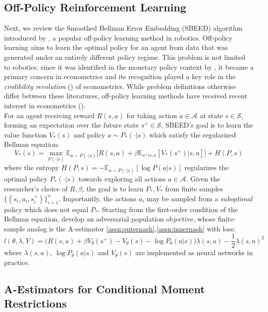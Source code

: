 \documentclass[12pt]{article}
\theoremstyle{myplain}
\theoremstyle{definition}
\theoremstyle{definition}
\theoremstyle{remark}
\numberwithin{equation}{section}
\begin{document}
\subsection{Off-Policy Reinforcement Learning} \label{ex:RL}

Next, we review the Smoothed Bellman Error Embedding (SBEED) algorithm introduced by \cite{sbeed}, a popular off-policy learning method in robotics. Off-policy learning aims to learn the optimal policy for an agent from data that was generated under an entirely different policy regime. This problem is not limited to robotics: since it was identified in the monetary policy context by \cite{LUCAS197619}, it became a primary concern in econometrics and its recognition played a key role in the {\it credibility revolution} (\cite{credibilityrevolution}) of econometrics. While problem definitions otherwise differ between these literatures, off-policy learning methods have received recent interest in econometrics (\cite{offpolicyathey, policylearning}).\\

For an agent receiving reward $R(s,a)$ for taking action $a\in\mathcal{A}$ at state $s\in\mathcal{S}$, forming an expectation over the future state $s^{+}\in\mathcal{S}$, SBEED's goal is to learn the value function $V_*(s)$ and policy $a\sim P_*(\cdot|s)$  which satisfy the regularized Bellman equation:
$$V_*(s)=\max_{P(\cdot|s)} \mathbb{E}_{a\sim P(\cdot|s)}\Big[R(s,a)+\beta \mathbb{E}_{s^+|s, a}[V_*(s^+)|s, a]\Big] + H(P, s)$$
where the entropy $H(P, s)=-\mathbb{E}_{a\sim P(\cdot|s)}[\log P(a|s)]$ regularizes the optimal policy $P_*(\cdot|s)$ towards exploring all actions $a\in\mathcal{A}$. Given the researcher's choice of $R, \beta$, the goal is to learn $P_*, V_*$ from finite samples $\{(s_i, a_i, s^+_i)\}_{i=1}^n$. Importantly, the actions $a_i$ may be sampled from a {\it suboptimal} policy which does not equal $P_*$. Starting from the first-order condition of the Bellman equation, \cite{sbeed} develop an adversarial population objective, whose finite-sample analog is the A-estimator \ref{assn:outernash},\ref{assn:innernash} with loss:
\begin{equation}\label{eq:sbeed}
  l(\theta, \lambda, Y) = \big(R(s,a) +\beta V_\theta(s^+) - V_\theta(s)-\log P_\theta(a|s)\big)\lambda(s, a) - \frac{1}{2}\lambda(s, a)^2  
\end{equation}
where $\lambda(s, a)$, $\log P_\theta(a|s)$ and $V_\theta(s)$ are implemented as neural networks in practice. 

\subsection{A-Estimators for Conditional Moment Restrictions} \label{ex:CMR}
\end{document}
